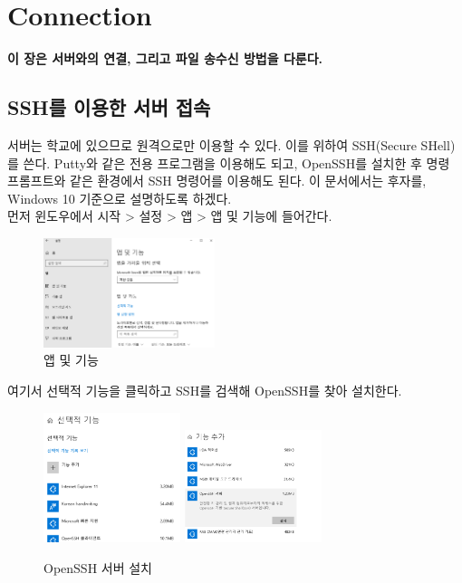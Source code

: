 
\graphicspath{{./chap2/images/}}
\chapter{Connection}
  
\textbf{이 장은 서버와의 연결, 그리고 파일 송수신 방법을 다룬다.}

\section{SSH를 이용한 서버 접속}
	서버는 학교에 있으므로 원격으로만 이용할 수 있다. 이를 위하여 SSH(Secure SHell)를 쓴다. Putty와 같은 전용 프로그램을 이용해도 되고, OpenSSH를 설치한 후 명령 프롬프트와 같은 환경에서 SSH 명령어를 이용해도 된다. 이 문서에서는 후자를, Windows 10 기준으로 설명하도록 하겠다.\\
	
	먼저 윈도우에서 시작 > 설정 > 앱 > 앱 및 기능에 들어간다.
	\begin{figure}[h]
	\begin{center}
        \includegraphics[width=5cm]{ssh1.png}
        \caption{앱 및 기능}
    \end{center}
    \end{figure}
	
	여기서 선택적 기능을 클릭하고 SSH를 검색해 OpenSSH를 찾아 설치한다.
	
	\begin{figure}[H]
	\begin{center}
        \includegraphics[width=4cm]{ssh2.png}
        \includegraphics[width=4cm]{ssh3.png}
        \caption{OpenSSH 서버 설치}
    \end{center}
    \end{figure}
    

